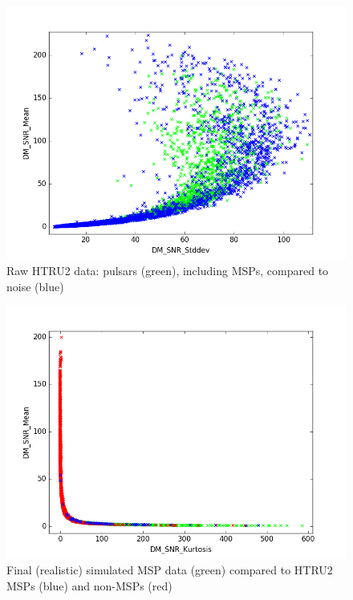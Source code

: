 \documentclass[12pt]{article}
\begin{document}
\begin{figure}[h!]
\begin{center}
\includegraphics[scale=0.5]{htru2_noise(b)_psr(g)_dm_mean_vs_stddev.png}
\caption{Raw HTRU2 data: pulsars (green), including MSPs, compared to noise (blue)}
\label{htru2noisepsr}
\end{center}
\end{figure}

\begin{figure}[h!]
\begin{center}
\includegraphics[scale=0.5]{htru2_msp(b)_non_msp(r)_sim_r5(g)_dm_mean_vs_skew.png}
\caption{Final (realistic) simulated MSP data (green) compared to HTRU2 MSPs (blue) and non-MSPs (red)}
\label{htru2simr5}
\end{center}
\end{figure}
\end{document}
